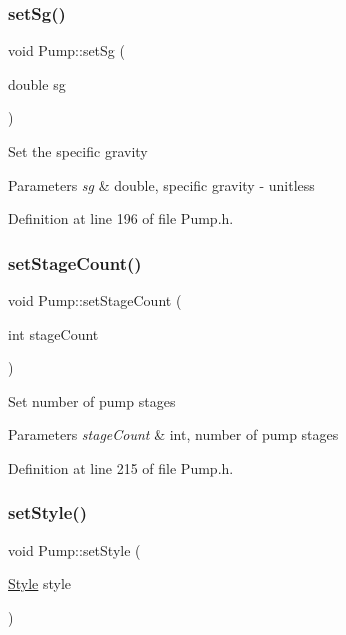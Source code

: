 \subsubsection{\texorpdfstring{set\+Sg()}{setSg()}}
{\footnotesize\ttfamily void Pump\+::set\+Sg (\begin{DoxyParamCaption}\item[{double}]{sg }\end{DoxyParamCaption})\hspace{0.3cm}{\ttfamily [inline]}}

Set the specific gravity


\begin{DoxyParams}{Parameters}
{\em sg} & double, specific gravity -\/ unitless \\
\hline
\end{DoxyParams}


Definition at line 196 of file Pump.\+h.

\mbox{\label{class_pump_a28943405616a792c970b7e9bbf01c1b2}} 
\subsubsection{\texorpdfstring{set\+Stage\+Count()}{setStageCount()}}
{\footnotesize\ttfamily void Pump\+::set\+Stage\+Count (\begin{DoxyParamCaption}\item[{int}]{stage\+Count }\end{DoxyParamCaption})\hspace{0.3cm}{\ttfamily [inline]}}

Set number of pump stages


\begin{DoxyParams}{Parameters}
{\em stage\+Count} & int, number of pump stages \\
\hline
\end{DoxyParams}


Definition at line 215 of file Pump.\+h.

\mbox{\label{class_pump_a4852cb47f40a46ba84c7dff91d1abd53}} 
\subsubsection{\texorpdfstring{set\+Style()}{setStyle()}}
{\footnotesize\ttfamily void Pump\+::set\+Style (\begin{DoxyParamCaption}\item[{\hyperlink{class_pump_aef354601ce4218258cc898b35a1e90ff}{Style}}]{style }\end{DoxyParamCaption})\hspace{0.3cm}{\ttfamily [inline]}}


